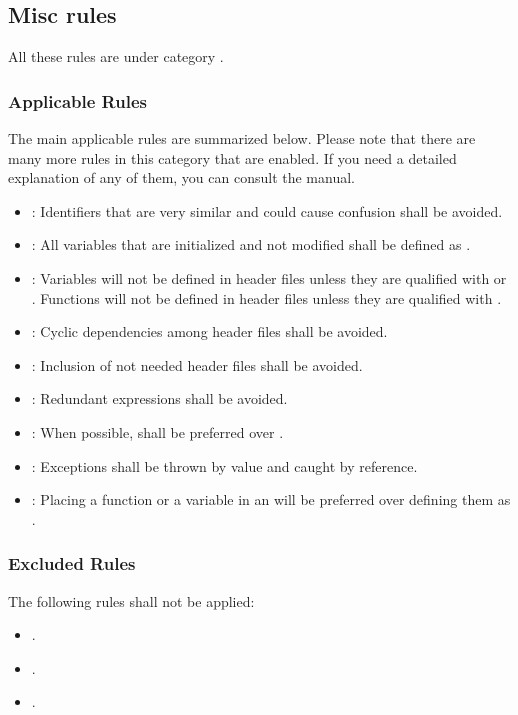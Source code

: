 \subsection{Misc rules}

All these rules are under category
.

\subsubsection{Applicable Rules}

The main applicable rules are summarized below. Please note that there are many more
rules in this category that are enabled. If you need a detailed explanation of any of them,
you can consult the  manual.

\begin{itemize}

\item {}:
Identifiers that are very similar and could cause confusion shall be avoided.

\item {}:
All variables that are initialized and not modified shall be defined as
.

\item {}:
Variables will not be defined in header files unless they are qualified
with  or .
Functions will not be defined in header files unless they are qualified
with .

\item {}:
Cyclic dependencies among header files shall be avoided.

\item {}:
Inclusion of not needed header files shall be avoided.

\item {}:
Redundant expressions shall be avoided.

\item {}:
When possible,  shall be preferred over .

\item {}:
Exceptions shall be thrown by value and caught by reference.

\item {}:
Placing a function or a variable in an  will be
preferred over defining them as .

\end{itemize}

\subsubsection{Excluded Rules}

The following rules shall not be applied:

\begin{itemize}

\item {}.
\item {}.
\item {}.

\end{itemize}
